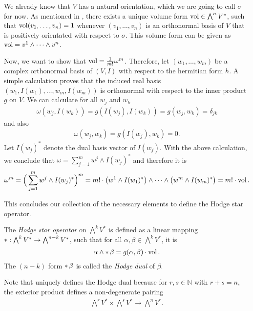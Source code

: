 \begin{rem}
	\label{loc-theory:volume-form-locally}
	We already know that $V$ has a natural orientation, which we are going to call $\sigma$ for now.
	As mentioned in \cite[p.\,83 below Theorem 4-6]{Spivak1965}, there exists a unique volume form 
	$\operatorname{vol} \in \bigwedge^nV^*$, such that $\operatorname{vol}(v_1, \dots, v_n)= 1$ whenever $(v_1, \dots, v_n)$ is 
	an orthonormal basis of $V$ that is positively orientated with respect to $\sigma$. This volume form can 
	be given as $\operatorname{vol} = v^1 \wedge \dots \wedge v^n$.
	
	Now, we want to show that $\operatorname{vol} = \frac{1}{m!} \omega^m$. %
	Therefore, let $(w_1,\dots,w_m)$ be a complex orthonormal basis of $(V,I)$ with respect to the
	hermitian form $h$. A simple calculation proves that the induced real basis $(w_1,I(w_1),\dots,w_m,I(w_m))$ 
	is orthonormal with respect to the inner product $g$ on $V$. We can calculate for all $w_j$ and $w_k$
	\begin{align*}
		\omega(w_j,I(w_k)) = g(I(w_j),I(w_k)) = g(w_j,w_k) = \delta_{jk}
	\end{align*}
	and also
	\begin{align*}
		\omega(w_j,w_k) = g(I(w_j),w_k) = 0.
	\end{align*}
	Let $I(w_j)^*$ denote the dual basis vector of $I(w_j)$. With the above calculation, we conclude
	that $\omega = \sum_{j=1}^{m} w^j \wedge I(w_j)^*$ and therefore it is
	\begin{align*}
		\omega^m = \Big(\sum_{j=1}^{m} w^j \wedge I(w_j)^*\Big)^m= m! \cdot \big(w^1 \wedge I(w_1)^*\big)
		\wedge \dots \wedge \big(w^m\wedge I(w_m)^*\big) 
		= m! \cdot \operatorname{vol}.
	\end{align*}
\end{rem}
This concludes our collection of the necessary elements to define the Hodge star operator.
\begin{defn}
	The \emph{Hodge star operator} on $\bigwedge^k V^*$ is defined as a linear mapping 
	$\operatorname{\ast}: \bigwedge^k V^* \rightarrow \bigwedge^{n-k}V^*$, such that for all 
	$\alpha,\beta \in\bigwedge^kV^*$, it is
	\begin{align}
		\label{loc-theory:eq:hodge-star}
		\alpha \wedge \operatorname{\ast}\beta = g(\alpha,\beta) \cdot \operatorname{vol}.
	\end{align}
	The $(n-k)$ form $\operatorname{\ast} \beta$ is called the \emph{Hodge dual} of $\beta$.
\end{defn}
Note that  uniquely defines the Hodge dual because for $r,s \in
\mathbb{N}$ with $r + s = n$, the exterior product defines a non-degenerate pairing 
\begin{align*}
	\bigwedge\nolimits^r V^* \times \bigwedge\nolimits^s V^* \rightarrow \bigwedge\nolimits^{n} V^*.
\end{align*}

